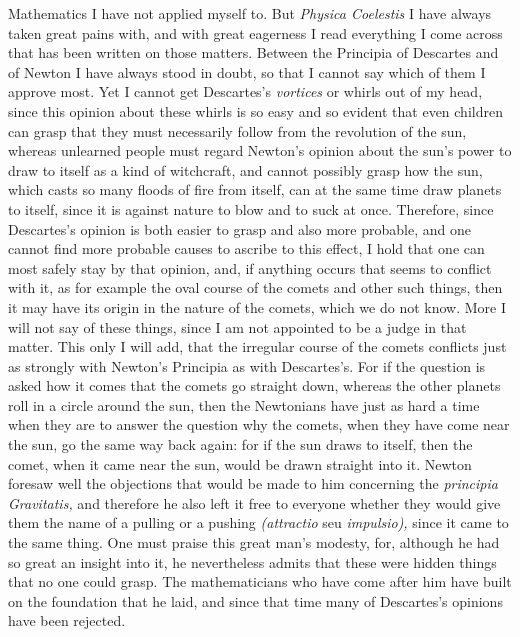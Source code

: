 \documentclass[12pt,a4paper,openany]{book}
\newcommand{\opage}[1]{\marginnote{\footnotesize\textit{[#1]}}}
\begin{document}
Mathematics I have not applied myself to. But \textit{Physica
Coelestis} I have always taken great pains with, and with great eagerness I
read everything I come across that has been written on those matters. Between
the Principia of Descartes and of Newton I have always stood in doubt, so that
I cannot say which of them I approve most. Yet I cannot get Descartes's
\textit{vortices} or whirls out of my head, since this opinion about these
whirls is so easy and so evident that even children can grasp that they must
necessarily follow from the revolution of the sun, whereas unlearned people must
regard Newton's opinion about the sun's power to draw to itself as a kind of
witchcraft, and cannot possibly grasp how the sun, which casts so many floods
of fire from itself, can at the same time draw planets to itself, since it is
against nature to blow and to suck at once. Therefore, since Descartes's opinion
is both easier to grasp and also more probable, and one cannot find more
probable causes to ascribe to this effect, I hold that one can most safely
stay by that opinion, and, if anything occurs that seems to conflict with it,
as for example the oval course of the comets and other such things, then it may
have its origin in the nature of the comets, which we do not know. More I will
not say of these things, since I am not appointed to be a judge in that matter.
This only I will add, that the irregular course of the comets conflicts just as
strongly with Newton's Principia as with Descartes's. For if the question is
asked how it comes that the comets go straight down, whereas the other planets
roll in a circle around the sun, then the Newtonians have just as hard a time
when they are to answer the question why the comets, when they have come near
the sun, go the same way
\setcounter{footnote}{0}%
\opage{7}back again: for if the sun draws to itself, then the comet, when it came
near the sun, would be drawn straight into it. Newton foresaw well the
objections that would be made to him concerning the \textit{principia
Gravitatis,} and therefore he also left it free to everyone whether they would
give them the name of a pulling or a pushing \textit{(attractio} seu
\textit{impulsio),} since it came to the same thing. One must praise this great
man's modesty, for, although he had so great an insight into it, he
nevertheless admits that these were hidden things that no one could grasp. The
mathematicians who have come after him have built on the foundation that he
laid, and since that time many of Descartes's opinions have been rejected.
\end{document}
